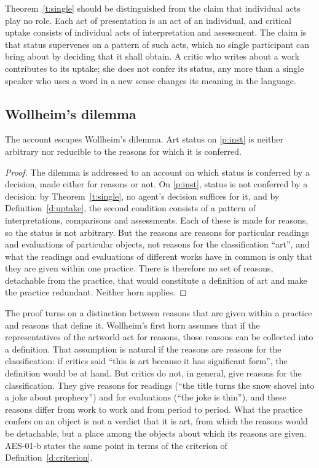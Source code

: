 \documentclass{situationist-preprint}
\begin{document}
Theorem~\ref{t:single} should be distinguished from the claim that individual acts play no role. Each act of presentation is an act of an individual, and critical uptake consists of individual acts of interpretation and assessment. The claim is that status supervenes on a pattern of such acts, which no single participant can bring about by deciding that it shall obtain. A critic who writes about a work contributes to its uptake; she does not confer its status, any more than a single speaker who uses a word in a new sense changes its meaning in the language.

\subsection{Wollheim's dilemma}

\begin{proposition}\label{p:wollheim}
The account escapes Wollheim's dilemma. Art status on \ref{p:inst} is neither arbitrary nor reducible to the reasons for which it is conferred.
\end{proposition}

\begin{proof}
The dilemma is addressed to an account on which status is conferred by a decision, made either for reasons or not. On \ref{p:inst}, status is not conferred by a decision: by Theorem~\ref{t:single}, no agent's decision suffices for it, and by Definition~\ref{d:uptake}, the second condition consists of a pattern of interpretations, comparisons and assessments. Each of these is made for reasons, so the status is not arbitrary. But the reasons are reasons for particular readings and evaluations of particular objects, not reasons for the classification \enquote{art}, and what the readings and evaluations of different works have in common is only that they are given within one practice. There is therefore no set of reasons, detachable from the practice, that would constitute a definition of art and make the practice redundant. Neither horn applies.
\end{proof}

The proof turns on a distinction between reasons that are given within a practice and reasons that define it. Wollheim's first horn assumes that if the representatives of the artworld act for reasons, those reasons can be collected into a definition. That assumption is natural if the reasons are reasons for the classification: if critics said \enquote{this is art because it has significant form}, the definition would be at hand. But critics do not, in general, give reasons for the classification. They give reasons for readings (\enquote{the title turns the snow shovel into a joke about prophecy}) and for evaluations (\enquote{the joke is thin}), and these reasons differ from work to work and from period to period. What the practice confers on an object is not a verdict that it is art, from which the reasons would be detachable, but a place among the objects about which its reasons are given. AES-01-b states the same point in terms of the criterion of Definition~\ref{d:criterion}.
\end{document}
